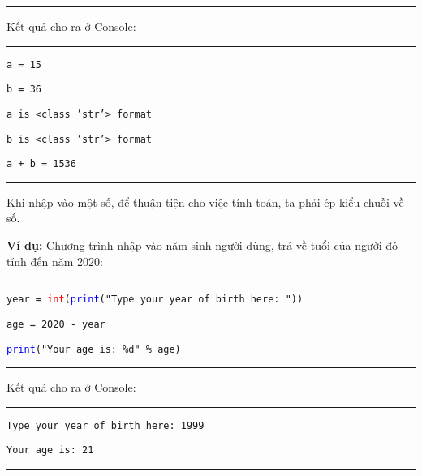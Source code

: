 \rule{\linewidth}{0.2mm}\par
\noindent
\resetlinenumber
Kết quả cho ra ở Console:\\
\rule{\linewidth}{0.2mm}\par
\begin{linenumbers}
	\texttt{a = 15}\par
	\texttt{b = 36}\par
	\texttt{a is <class 'str'> format}\par
	\texttt{b is <class 'str'> format}\par
	\texttt{a + b =  1536}
\end{linenumbers}
\rule{\linewidth}{0.2mm}\par
\resetlinenumber
Khi nhập vào một số, để thuận tiện cho việc tính toán, ta phải ép kiểu chuỗi về số.\par
\noindent
\textbf{Ví dụ:} Chương trình nhập vào năm sinh người dùng, trả về tuổi của người đó tính đến năm 2020:\\
\rule{\linewidth}{0.2mm}\par
\begin{linenumbers}
	\texttt{year = \textcolor{red}{int}(\textcolor{blue}{print}("Type your year of birth here: "))}\par
	\texttt{age = 2020 - year}\par
	\texttt{\textcolor{blue}{print}("Your age is: \%d" \% age)}
\end{linenumbers}
\rule{\linewidth}{0.2mm}\par
\noindent
\resetlinenumber
Kết quả cho ra ở Console:\\
\rule{\linewidth}{0.2mm}\par
\begin{linenumbers}
	\texttt{Type your year of birth here: 1999}\par
	\texttt{Your age is: 21}
\end{linenumbers}
\rule{\linewidth}{0.2mm}\par
\resetlinenumber
\newpage
